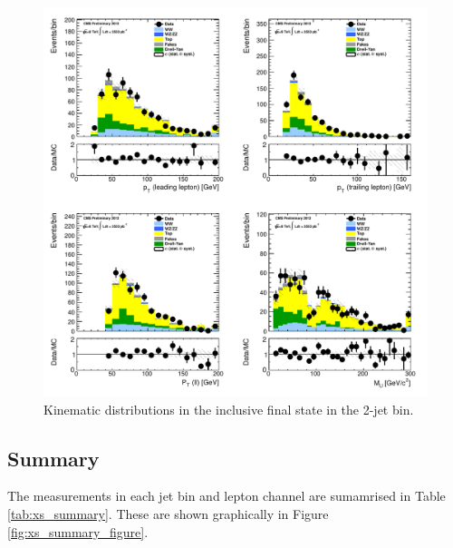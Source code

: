 \begin{figure}[!hbtp]
\centering
\includegraphics[width=1\textwidth]{figures/ww_analysis20_0_ALL_incl_2j.pdf} %
\caption{Kinematic distributions in the inclusive final state in the 2-jet bin.}
\label{fig:xs_kinematics_incl_2j}
\end{figure}

\clearpage
\subsection{Summary}

The measurements in each jet bin and lepton channel are sumamrised in
Table \ref{tab:xs_summary}.  These are shown graphically 
in Figure \ref{fig:xs_summary_figure}.

